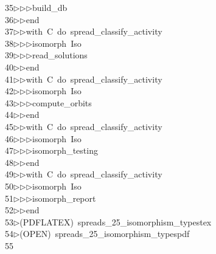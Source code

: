 \begin{tabbing}
35\>$\triangleright$\>$\triangleright$\>$\triangleright$\>build\_db\ \\[0pt]
36\>$\triangleright$\>$\triangleright$\>end\ \\[0pt]
37\>$\triangleright$\>$\triangleright$\>with\ C\ do\ spread\_classify\_activity\ \\[0pt]
38\>$\triangleright$\>$\triangleright$\>$\triangleright$\>isomorph\ Iso\ \\[0pt]
39\>$\triangleright$\>$\triangleright$\>$\triangleright$\>read\_solutions\ \\[0pt]
40\>$\triangleright$\>$\triangleright$\>end\ \\[0pt]
41\>$\triangleright$\>$\triangleright$\>with\ C\ do\ spread\_classify\_activity\ \\[0pt]
42\>$\triangleright$\>$\triangleright$\>$\triangleright$\>isomorph\ Iso\ \\[0pt]
43\>$\triangleright$\>$\triangleright$\>$\triangleright$\>compute\_orbits\ \\[0pt]
44\>$\triangleright$\>$\triangleright$\>end\ \\[0pt]
45\>$\triangleright$\>$\triangleright$\>with\ C\ do\ spread\_classify\_activity\ \\[0pt]
46\>$\triangleright$\>$\triangleright$\>$\triangleright$\>isomorph\ Iso\ \\[0pt]
47\>$\triangleright$\>$\triangleright$\>$\triangleright$\>isomorph\_testing\ \\[0pt]
48\>$\triangleright$\>$\triangleright$\>end\ \\[0pt]
49\>$\triangleright$\>$\triangleright$\>with\ C\ do\ spread\_classify\_activity\ \\[0pt]
50\>$\triangleright$\>$\triangleright$\>$\triangleright$\>isomorph\ Iso\ \\[0pt]
51\>$\triangleright$\>$\triangleright$\>$\triangleright$\>isomorph\_report\ \\[0pt]
52\>$\triangleright$\>$\triangleright$\>end\\[0pt]
53\>$\triangleright$\>(PDFLATEX)\ spreads\_25\_isomorphism\_typestex\\[0pt]
54\>$\triangleright$\>(OPEN)\ spreads\_25\_isomorphism\_typespdf\\[0pt]
55\>\end{tabbing}
